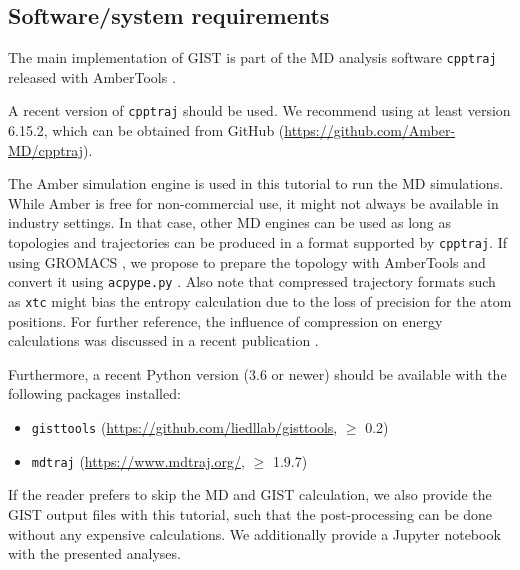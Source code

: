 \documentclass[9pt,tutorial]{livecoms}
\newcommand{\software}{\texttt}
\newcommand\inlinecode{\texttt}
\begin{document}
\subsection{Software/system requirements}
The main implementation of GIST is part of the MD analysis software \software{cpptraj} released with AmberTools \cite{amber22}.

A recent version of \software{cpptraj} should be used. We recommend using at least version 6.15.2, which can be obtained from GitHub (\url{https://github.com/Amber-MD/cpptraj}).

The Amber simulation engine is used in this tutorial to run the MD simulations.
While Amber is free for non-commercial use, it might not always be available in industry settings.
In that case, other MD engines can be used as long as topologies and trajectories can be produced in a format supported by \software{cpptraj}.
If using GROMACS \cite{Abraham2015-gromacs,Pronk2013-gromacs}, we propose to prepare the topology with AmberTools and convert it using \software{acpype.py} \cite{Sousa_da_Silva2012-acpype}.
Also note that compressed trajectory formats such as \inlinecode{xtc} might bias the entropy calculation due to the loss of precision for the atom positions. For further reference, the influence of compression on energy calculations was discussed in a recent publication \cite{Roe2022-compression}.

Furthermore, a recent Python version (3.6 or newer) should be available with the following packages installed:
\begin{itemize}
	\item \software{gisttools} (\url{https://github.com/liedllab/gisttools}, $\geq$ 0.2)
	\item \software{mdtraj} (\url{https://www.mdtraj.org/}, $\geq$ 1.9.7) \cite{McGibbon2015-mdtraj}
\end{itemize}



If the reader prefers to skip the MD and GIST calculation, we also provide the GIST output files with this tutorial, such that the post-processing can be done without any expensive calculations.
We additionally provide a Jupyter notebook \cite{Kluyver2016-jupyter,Granger2021-jupyter} with the presented analyses. 
\end{document}
